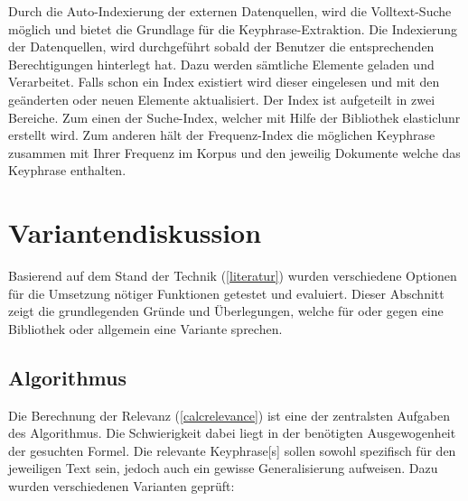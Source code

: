 
Durch die Auto-Indexierung der externen Datenquellen, wird die Volltext-Suche möglich und bietet die Grundlage für die \gls{Keyphrase}-Extraktion. Die Indexierung der Datenquellen, wird durchgeführt sobald der Benutzer die entsprechenden Berechtigungen hinterlegt hat. Dazu werden sämtliche Elemente geladen und Verarbeitet. Falls schon ein Index existiert wird dieser eingelesen und mit den ge\-än\-der\-ten oder neuen Elemente aktualisiert. Der Index ist aufgeteilt in zwei Bereiche. Zum einen der Suche-Index, welcher mit Hilfe der Bibliothek \gls{elasticlunr} erstellt wird. Zum anderen hält der Frequenz-Index die möglichen \gls{Keyphrase} zusammen mit Ihrer Frequenz im Korpus und den jeweilig Dokumente welche das \gls{Keyphrase} enthalten.


\section{Variantendiskussion}



Basierend auf dem Stand der Technik (\autoref{literatur}) wurden verschiedene Optionen für die Umsetzung nötiger Funktionen getestet und evaluiert. Dieser Abschnitt zeigt die grundlegenden Gründe und Üb\-er\-le\-gun\-gen, welche für oder gegen eine Bibliothek oder allgemein eine Variante sprechen.



\subsection{Algorithmus}


Die Berechnung der Relevanz (\autoref{calcrelevance}) ist eine der zentralsten Aufgaben des Algorithmus. Die Schwierigkeit dabei liegt in der benötigten Ausgewogenheit der gesuchten Formel. Die relevante \gls{Keyphrase}[s] sollen sowohl spezifisch für den jeweiligen Text sein, jedoch auch ein gewisse Generalisierung aufweisen. Dazu wurden verschiedenen Varianten geprüft:

